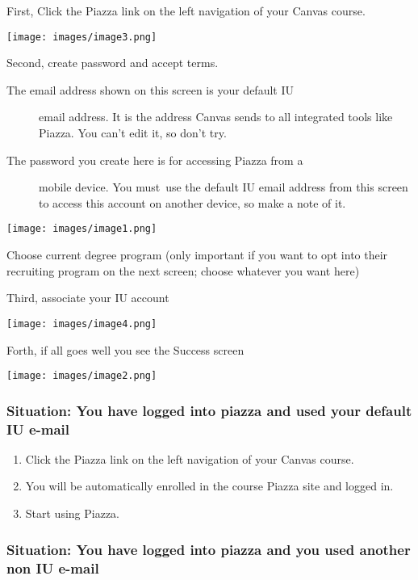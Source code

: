 First, Click the Piazza link on the left navigation of your Canvas
course.

\texttt{[image: images/image3.png]}

Second, create password and accept terms.

\begin{description}
\item[The email address shown on this screen is your default IU]
email address. It is the address Canvas sends to all integrated tools
like Piazza. You can't edit it, so don't try.
\end{description}

\begin{description}
\item[The password you create here is for accessing Piazza from a]
mobile device. You must~use the default IU email address from this
screen to access this account on another device, so make a note of it.
\end{description}

\texttt{[image: images/image1.png]}

Choose current degree program (only important if you want to opt into
their recruiting program on the next screen; choose whatever you want
here)

Third, associate your IU account

\texttt{[image: images/image4.png]}

Forth, if all goes well you see the Success screen

\texttt{[image: images/image2.png]}

\subsubsection{Situation: You have logged into piazza and used your
default IU
e-mail}\label{situation-you-have-logged-into-piazza-and-used-your-default-iu-e-mail}

\begin{enumerate}
\tightlist
\item
  Click the Piazza link on the left navigation of your Canvas course.
\item
  You will be automatically enrolled in the course Piazza site and
  logged in.
\item
  Start using Piazza.
\end{enumerate}

\subsubsection{Situation: You have logged into piazza and you used
another non IU
e-mail}\label{situation-you-have-logged-into-piazza-and-you-used-another-non-iu-e-mail}

